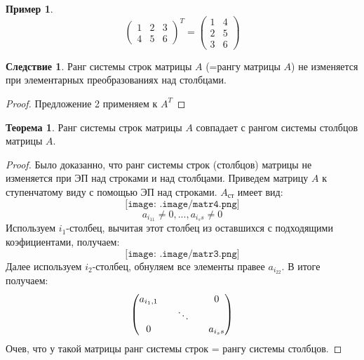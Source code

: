 \documentclass[a4paper, 12pt]{article}
\newcounter{thcount}
\theoremstyle{definition}
\newtheorem*{consequense}{Следствие}
\newtheorem*{example1}{Пример}
\newtheorem{theoremnum}[thcount]{Теорема}
\begin{document}
  \begin{example1}
    $$\begin{pmatrix}
      1&2&3\\
      4&5&6
    \end{pmatrix}^T
    = \begin{pmatrix}
      1&4\\
      2&5\\
      3&6
    \end{pmatrix}$$ 
  \end{example1}
  \begin{consequense} 
    Ранг системы строк матрицы $A$ (=рангу матрицы $A$) не изменяется при элементарных преобразованиях над столбцами. 
  \end{consequense} 
  \begin{proof}
    Предложение 2 применяем к $A^T$ 
  \end{proof} 
  \begin{theoremnum} 
    Ранг системы строк матрицы $A$ совпадает с рангом системы столбцов матрицы $A$.
  \end{theoremnum} 
  \begin{proof}
    Было доказанно, что ранг системы строк (столбцов) матрицы не изменяется при ЭП над строками и над столбцами. Приведем матрицу $A$ к ступенчатому виду с помощью ЭП над строками. $A_\text{ст}$ имеет вид:
    $$\texttt{[image: .image/matr4.png]}$$
    $$a_{i_11} \neq 0,...,a_{i_ss} \neq 0$$ 
    Используем $i_1$-столбец, вычитая этот столбец из оставшихся с подходящими коэфициентами, получаем:
    $$\texttt{[image: .image/matr3.png]}$$ 
    Далее используем $i_2$-столбец, обнуляем все элементы правее $a_{i_22}$. В итоге получаем: $$\begin{pmatrix}
      a_{i_1,1} && \null && 0\\
      \null && \ddots && \null\\
      0 && \null && a_{i_ss}
    \end{pmatrix}$$
    Очев, что у такой матрицы ранг системы строк = рангу системы столбцов.
  \end{proof} 
\end{document}
